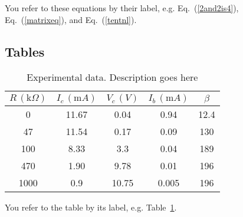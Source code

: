\documentclass[aps,pre,twocolumn,nofootinbib]{revtex4}
\begin{document}
 
 You refer to these equations by their label, e.g. Eq.~(\ref{2and2is4}), Eq.~(\ref{matrixeq}), and Eq.~(\ref{tentnl}).

\subsection{Tables}
%
%
\begin{table}[h]
	\caption{Experimental data.  Description goes here }
\begin{ruledtabular}
	\begin{tabular}{ccccc} 
	$R \, (\mathrm{k} \Omega)$ & $I_c \, (\mathrm{m} A)$ & $V_c \, (V)$ & $I_b \, (\mathrm{m} A)$ & $\beta$ \\  \hline
	0 & 11.67 & 0.04 &  0.94 &  12.4 \\ 
	47 & 11.54 & 0.17  & 0.09  & 130 \\ 
	100 & 8.33 & 3.3  & 0.04  & 189 \\ 
	470 & 1.90 & 9.78  & 0.01  & 196 \\ 
	1000 & 0.9 & 10.75  & 0.005  & 196 \\ 
	\end{tabular}
	\end{ruledtabular}
	\label{tab:data}
\end{table}

 You refer to the table by its label, e.g. Table~\ref{tab:data}.






\appendix*
\section{}
\end{document}
